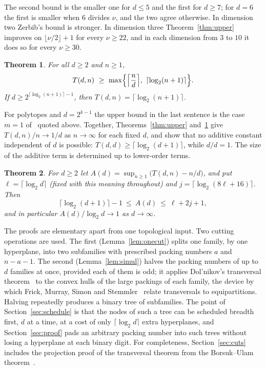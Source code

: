 \documentclass[11pt]{amsart}
\newtheorem{theorem}{Theorem}[section]
\theoremstyle{remark}
\newcommand{\ceil}[1]{\lceil #1\rceil}
\newcommand{\floor}[1]{\lfloor #1\rfloor}
\begin{document}
The second bound is the smaller one for $d\le5$ and the first for $d\ge7$; for $d=6$ the first is smaller when $6$
divides $\nu$, and the two agree otherwise. In dimension two Zerbib's bound is stronger. In
dimension three Theorem~\ref{thm:upper} improves on $\floor{\nu/2}+1$ for every $\nu\ge22$, and in each dimension from
$3$ to $10$ it does so for every $\nu\ge30$.

\begin{theorem}\label{thm:lower}
For all $d\ge2$ and $n\ge1$,
\[
T(d,n)\ \ge\ \max\Bigl\{\Bigl\lceil\frac nd\Bigr\rceil,\ \ceil{\log_2(n+1)}\Bigr\}.
\]
If $d\ge 2^{\ceil{\log_2(n+1)}-1}$, then $T(d,n)=\ceil{\log_2(n+1)}$.
\end{theorem}

For polytopes and $d=2^{k-1}$ the upper bound in the last sentence is the case $m=1$ of~\cite[Theorem~1.5]{FMSS24}
quoted above. Together, Theorems~\ref{thm:upper} and~\ref{thm:lower} give $T(d,n)/n\to1/d$ as $n\to\infty$ for each
fixed $d$, and show that no additive constant independent of $d$ is possible: $T(d,d)\ge\ceil{\log_2(d+1)}$, while
$d/d=1$. The size of the additive term is determined up to lower-order terms.

\begin{theorem}\label{thm:loss}
For $d\ge2$ let $A(d)=\sup_{n\ge1}\bigl(T(d,n)-n/d\bigr)$, and put $\ell=\ceil{\log_2 d}$ (fixed with this meaning
throughout) and $j=\ceil{\log_2(8\ell+16)}$. Then
\[
\ceil{\log_2(d+1)}-1\ \le\ A(d)\ \le\ \ell+2j+1,
\]
and in particular $A(d)/\log_2 d\to1$ as $d\to\infty$.
\end{theorem}

The proofs are elementary apart from one topological input. Two cutting operations are used. The first
(Lemma~\ref{lem:onecut}) splits one family, by one hyperplane, into two subfamilies with prescribed packing numbers
$a$ and $n-a-1$. The second (Lemma~\ref{lem:simul}) halves the packing numbers of up to $d$ families at once, provided
each of them is odd; it applies Dol'nikov's transversal theorem~\cite{Dol92} to the convex hulls of the large packings
of each family, the device by which Frick, Murray, Simon and Stemmler~\cite[Section~1]{FMSS24} relate transversals to
equipartitions. Halving repeatedly produces a binary tree of subfamilies. The point of Section~\ref{sec:schedule} is
that the nodes of such a tree can be scheduled breadth first, $d$ at a time, at a cost of only $\ceil{\log_2 d}$ extra
hyperplanes, and Section~\ref{sec:proof} pads an arbitrary packing number into such trees without losing a hyperplane
at each binary digit. For completeness, Section~\ref{sec:cuts} includes the projection proof of the transversal theorem
from the Borsuk--Ulam theorem~\cite{Bor33}.
\end{document}
